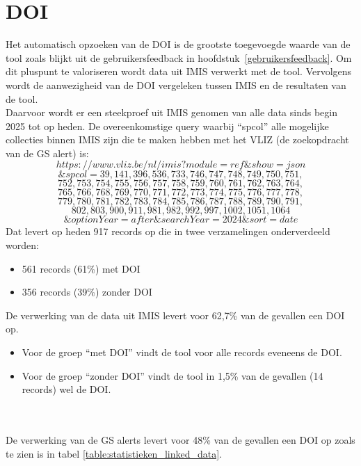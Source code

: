 \section{DOI}
\label{discussiedoi}
Het automatisch opzoeken van de DOI is de grootste toegevoegde waarde van de tool zoals blijkt uit de gebruikersfeedback in hoofdstuk~\ref{gebruikersfeedback}. Om dit pluspunt te valoriseren wordt data uit IMIS verwerkt met de tool. Vervolgens wordt de aanwezigheid van de DOI vergeleken tussen IMIS en de resultaten van de tool.\\
Daarvoor wordt er een steekproef uit IMIS genomen van alle data sinds begin 2025 tot op heden.
De overeenkomstige query waarbij ``spcol'' alle mogelijke collecties binnen IMIS zijn die te maken hebben met het VLIZ (de zoekopdracht van de GS alert) is:
\[https://www.vliz.be/nl/imis?module=ref\&show=json\]
\[\&spcol=39,141,396,536,733,746,747,748,749,750,751,\]
\[752,753,754,755,756,757,758,759,760,761,762,763,764,\]
\[765,766,768,769,770,771,772,773,774,775,776,777,778,\]
\[779,780,781,782,783,784,785,786,787,788,789,790,791,\]
\[802,803,900,911,981,982,992,997,1002,1051,1064\]
\[\&optionYear=after\&searchYear=2024\&sort=date\]
Dat levert op heden 917 records op die in twee verzamelingen onderverdeeld worden:
\begin{itemize}
    \item 561 records (61\%) met DOI
    \item 356 records (39\%) zonder DOI
\end{itemize}
De verwerking van de data uit IMIS levert voor 62,7\% van de gevallen een DOI op.
\begin{itemize}
    \item Voor de groep ``met DOI'' vindt de tool voor alle records eveneens de DOI.
    \item Voor de groep ``zonder DOI'' vindt de tool in 1,5\% van de gevallen (14 records) wel de DOI.
\end{itemize}
\\\\
De verwerking van de GS alerts levert voor 48\% van de gevallen een DOI op zoals te zien is in tabel \ref{table:statistieken_linked_data}.
